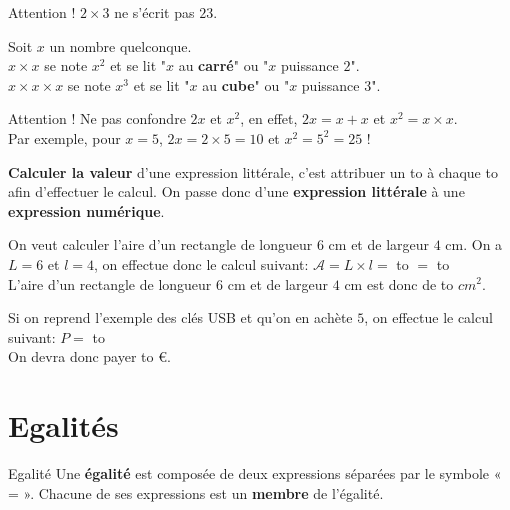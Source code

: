 \documentclass[12pt]{article}
\newif\iftrou\troutrue
\newlength{\trouwidth}
\newcommand{\trou}[1]{%
	\iftrou%
	\settowidth{\trouwidth}{#1}%
	\hbox to \trouwidth{\dotfill}%
	\else%
	#1%
	\fi}
\begin{document}
\begin{rem}{Attention !}{}
	$2 \times 3$ ne s'écrit pas $23$.
\end{rem}

\begin{defin}{}{}
	Soit $x$ un nombre quelconque.\\
	$x\times x$ se note $x^2$ et se lit "$x$ au \textbf{carré}" ou "$x$ puissance $2$".\\
	$x\times x \times x$ se note $x^3$ et se lit "$x$ au \textbf{cube}" ou "$x$ puissance $3$".
\end{defin}


\begin{rem}{Attention ! }{}
Ne pas confondre $2x$ et $x^2$, en effet, $2x = x+x$ et $x^2=x \times x$.\\
Par exemple, pour $x=5$, $2x=2 \times 5 =10$ et $x^2=5^2=25$ !
\end{rem}

\begin{defin}{}{}
	\textbf{Calculer la valeur} d’une expression littérale, c’est attribuer un \trou{nombre} à chaque \trou{lettre} afin d’effectuer le calcul. On passe donc d'une \textbf{expression littérale} à une \textbf{expression numérique}.
\end{defin}


\begin{ex}{}{}
On veut calculer l’aire d’un rectangle de longueur $6$ cm et de largeur $4$ cm. On a $L = 6$ et $l = 4$, on effectue donc le calcul suivant: 
$\mathcal{A} = L \times l = $ \trou{$ 6 \times 4$} $=$ \trou{$24$}\\
L’aire d’un rectangle de longueur $6$ cm et de largeur $4$ cm est donc de \trou{$24$} $cm^2$.
\end{ex}

\begin{ex}{}{}
	Si on reprend l'exemple des clés USB et qu'on en achète $5$, on effectue le calcul suivant: $P= $\trou{$4 \times 5 +3$}\\
	On devra donc payer \trou{$23$}\euro.
\end{ex}



\section{Egalités}

\begin{defin}{Egalité}{}
	Une \textbf{égalité} est composée de deux expressions séparées par le symbole « = ». Chacune de ses expressions est un \textbf{membre} de l'égalité.
\end{defin}
\end{document}
